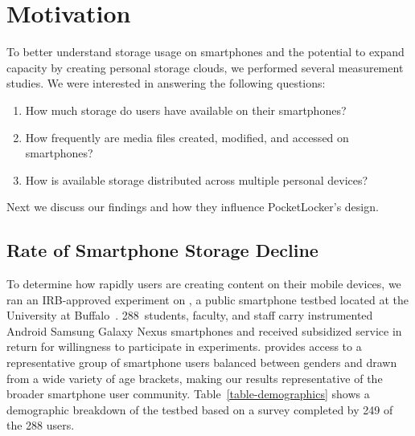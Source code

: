 
\section{Motivation}
\label{sec-motivation}

To better understand storage usage on smartphones and the potential to expand
capacity by creating personal storage clouds, we performed several
measurement studies. We were interested in answering the following questions:

\begin{enumerate}

\item How much storage do users have available on their smartphones?

\item How frequently are media files created, modified, and accessed on
smartphones?

\item How is available storage distributed across multiple personal devices?

\end{enumerate}

Next we discuss our findings and how they influence PocketLocker's design.

\subsection{Rate of Smartphone Storage Decline}



%
%
%
%

To determine how rapidly users are creating content on their mobile devices,
we ran an IRB-approved experiment on \PhoneLab{}, a public smartphone testbed
located at the University at Buffalo~\cite{nandugudi2013phonelab}.
288~students, faculty, and staff carry instrumented Android Samsung Galaxy
Nexus smartphones and received subsidized service in return for willingness
to participate in experiments. \PhoneLab{} provides access to a
representative group of smartphone users balanced between genders and drawn
from a wide variety of age brackets, making our results representative of the
broader smartphone user community. Table~\ref{table-demographics} shows a
demographic breakdown of the testbed based on a survey completed by 249 of
the 288 \PhoneLab{} users.

